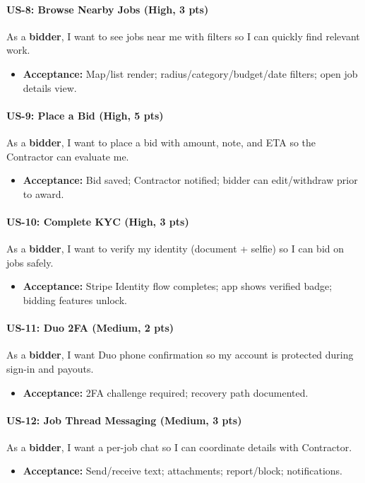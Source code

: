 \documentclass[11pt]{article}
\begin{document}
\paragraph{US-8: Browse Nearby Jobs (High, 3 pts)}
As a \textbf{bidder}, I want to see jobs near me with filters so I can quickly find relevant work.
\begin{itemize}[leftmargin=1.4em]
  \item \textbf{Acceptance:} Map/list render; radius/category/budget/date filters; open job details view.
\end{itemize}

\paragraph{US-9: Place a Bid (High, 5 pts)}
As a \textbf{bidder}, I want to place a bid with amount, note, and ETA so the Contractor can evaluate me.
\begin{itemize}[leftmargin=1.4em]
  \item \textbf{Acceptance:} Bid saved; Contractor notified; bidder can edit/withdraw prior to award.
\end{itemize}

\paragraph{US-10: Complete KYC (High, 3 pts)}
As a \textbf{bidder}, I want to verify my identity (document + selfie) so I can bid on jobs safely.
\begin{itemize}[leftmargin=1.4em]
  \item \textbf{Acceptance:} Stripe Identity flow completes; app shows verified badge; bidding features unlock.
\end{itemize}

\paragraph{US-11: Duo 2FA (Medium, 2 pts)}
As a \textbf{bidder}, I want Duo phone confirmation so my account is protected during sign-in and payouts.
\begin{itemize}[leftmargin=1.4em]
  \item \textbf{Acceptance:} 2FA challenge required; recovery path documented.
\end{itemize}

\paragraph{US-12: Job Thread Messaging (Medium, 3 pts)}
As a \textbf{bidder}, I want a per-job chat so I can coordinate details with Contractor.
\begin{itemize}[leftmargin=1.4em]
  \item \textbf{Acceptance:} Send/receive text; attachments; report/block; notifications.
\end{itemize}
\end{document}
